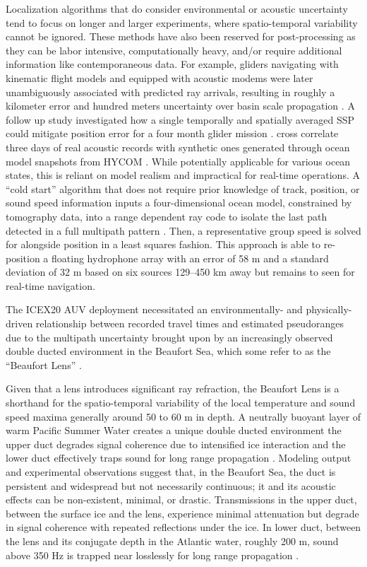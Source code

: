 Localization algorithms that do consider environmental or acoustic uncertainty tend to focus on longer and larger experiments, where spatio-temporal variability cannot be ignored.
These methods have also been reserved for post-processing as they can be labor intensive, computationally heavy, and/or require additional information like contemporaneous data.
For example, gliders navigating with kinematic flight models and equipped with acoustic modems were later unambiguously associated with predicted ray arrivals, resulting in roughly a kilometer error and hundred meters uncertainty over basin scale propagation \cite{VanUffelen2013}.
A follow up study investigated how a single temporally and spatially averaged SSP could mitigate position error for a four month glider mission \cite{vanuffelen2016localization}.
\citet{Wu2019} cross correlate three days of real acoustic records with synthetic ones generated through ocean model snapshots from HYCOM \cite{chassignet_hycom_2007}.
While potentially applicable for various ocean states, this is reliant on model realism and impractical for real-time operations.
A ``cold start'' algorithm that does not require prior knowledge of track, position, or sound speed information inputs a four-dimensional ocean model, constrained by tomography data, into a range dependent ray code to isolate the last path detected in a full multipath pattern \citep{Mikhalevsky2020}.
Then, a representative group speed is solved for alongside position in a least squares fashion. 
This approach is able to re-position a floating hydrophone array with an error of 58 m and a standard deviation of 32 m based on six sources 129--450 km away but remains to seen for real-time navigation.

The ICEX20 AUV deployment necessitated an environmentally- and physically-driven relationship between recorded travel times and estimated pseudoranges due to the multipath uncertainty brought upon by an increasingly observed double ducted environment in the Beaufort Sea, which some refer to as the ``Beaufort Lens'' \citep{litvak2015,chen_spectral_2019,chen_temporal_2020}.

Given that a lens introduces significant ray refraction, the Beaufort Lens is a shorthand for the spatio-temporal variability of the local temperature and sound speed maxima generally around 50 to 60 m in depth.
A neutrally buoyant layer of warm Pacific Summer Water creates a unique double ducted environment \textemdash the upper duct degrades signal coherence due to intensified ice interaction and the lower duct effectively traps sound for long range propagation \citep{Poulsen2016}. 
Modeling output \citep{duda_long-range_2019,duda_effects_2021} and experimental observations \citep{Ballard2020,Bhatt2021} suggest that, in the Beaufort Sea, the duct is persistent and widespread but not necessarily continuous; it and its acoustic effects can be non-existent, minimal, or drastic.
Transmissions in the upper duct, between the surface ice and the lens, experience minimal attenuation but degrade in signal coherence with repeated reflections under the ice.
In lower duct, between the lens and its conjugate depth in the Atlantic water, roughly 200 m, sound above 350 Hz is trapped near losslessly for long range propagation \citep{Poulsen2016}.

